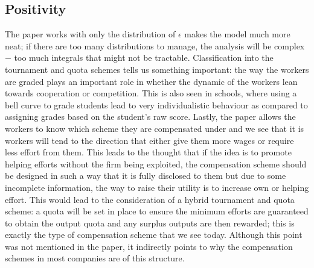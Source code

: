 \documentclass[a4paper,10pt]{article}
\theoremstyle{definition}
\begin{document}
 


\subsection*{Positivity}

The paper works with only the distribution of $\epsilon$ makes the model much more neat; if there are too many distributions to manage, the analysis will be complex $-$ too much integrals that might not be tractable. Classification into the tournament and quota schemes tells us something important: the way the workers are graded plays an important role in whether the dynamic of the workers lean towards cooperation or competition. This is also seen in schools, where using a bell curve to grade students lead to very individualistic behaviour as compared to assigning grades based on the student's raw score. Lastly, the paper allows the workers to know which scheme they are compensated under and we see that it is workers will tend to the direction that either give them more wages or require less effort from them. This leads to the thought that if the idea is to promote helping efforts without the firm being exploited, the compensation scheme should be designed in such a way that it is fully disclosed to them but due to some incomplete information, the way to raise their utility is to increase own or helping effort. This would lead to the consideration of a hybrid tournament and quota scheme:  a quota will be set in place to ensure the minimum efforts are guaranteed to obtain the output quota and any surplus outputs are then rewarded; this is exactly the type of compensation scheme that we see today. Although this point was not mentioned in the paper, it indirectly points to why the compensation schemes in most companies are of this structure. 
\end{document}
